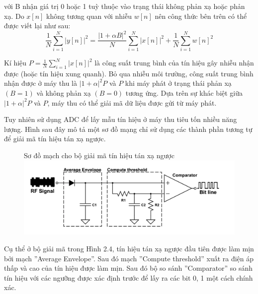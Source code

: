 \documentclass{uetgraduation}
\begin{document}
\begin{enumerate}
    với B nhận giá trị 0 hoặc 1 tuỳ thuộc vào trạng thái không phản xạ hoặc phản xạ. Do $x[n]$ không tương quan với nhiễu $w[n]$ nên công thức bên trên có thể được viết lại như sau:
    \begin{equation}
        \frac{1}{N} \sum_{i=1}^{N}|y[n]|^2 = \frac{|1 + \alpha B|^2}{N} \sum_{i=1}^{N}|x[n]|^2 + \frac{1}{N}\sum_{i=1}^{N}w[n]^2
    \end{equation}

    Kí hiệu $P = \frac{1}{N}\sum_{i=1}^{N}|x[n]|^2$ là công suất trung bình của tín hiệu gây nhiễu nhận được (hoặc tín hiệu xung quanh). Bỏ qua nhiễu môi trường, công suất trung bình
    nhận được ở máy thu là $|1 + \alpha|^2 P$ và $P$ khi máy phát ở trạng thái phản xạ $(B = 1)$ và không phản xạ $(B = 0)$ tương ứng. Dựa trên sự khác biệt giữa $|1 + \alpha|^2 P$ 
    và $P$, máy thu có thể giải mã dữ liệu được gửi từ máy phát.

    Tuy nhiên sử dụng ADC để lấy mẫu tín hiệu ở máy thu tiêu tốn nhiều năng lượng. Hình sau đây mô tả một sơ đồ mạng chỉ sử dụng các thành phần tương tự để giải mã tín hiệu tán xạ ngược.
    \begin{figure}{Sơ đồ mạch cho bộ giải mã tín hiệu tán xạ ngược}
        \centering
        \includegraphics[scale=0.7]{backscatter_circuit}
        \label{fig:backscatter}
    \end{figure}

    Cụ thể ở bộ giải mã trong Hình 2.4, tín hiệu tán xạ ngược đầu tiên được làm mịn bởi mạch ''Average Envelope''. Sau đó mạch ''Compute threshold'' xuất ra điện áp thấp và cao của tín
    hiệu được làm mịn. Sau đó bộ so sánh ''Comparator'' so sánh tín hiệu với các ngưỡng được xác định trước để lấy ra các bit 0, 1 một cách chính xác.

\end{enumerate}

\end{document}
